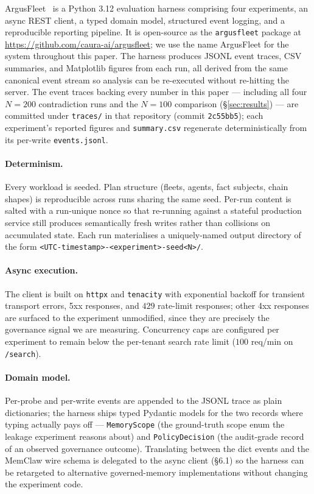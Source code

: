 \documentclass[10pt,twocolumn,letterpaper]{article}
\begin{document}
ArgusFleet~\citep{argusfleet} is a Python 3.12 evaluation harness comprising four experiments, an async REST client, a typed domain model, structured event logging, and a reproducible reporting pipeline. It is open-source as the \texttt{argusfleet} package at \url{https://github.com/caura-ai/argusfleet}; we use the name ArgusFleet for the system throughout this paper. The harness produces JSONL event traces, CSV summaries, and Matplotlib figures from each run, all derived from the same canonical event stream so analysis can be re-executed without re-hitting the server. The event traces backing every number in this paper --- including all four \(N{=}200\) contradiction runs and the \(N{=}100\) comparison (\S\ref{sec:results}) --- are committed under \texttt{traces/} in that repository (commit \texttt{2c55bb5}); each experiment's reported figures and \texttt{summary.csv} regenerate deterministically from its per-write \texttt{events.jsonl}.

\paragraph{Determinism.}
Every workload is seeded. Plan structure (fleets, agents, fact subjects, chain shapes) is reproducible across runs sharing the same seed. Per-run content is salted with a run-unique nonce so that re-running against a stateful production service still produces semantically fresh writes rather than collisions on accumulated state. Each run materialises a uniquely-named output directory of the form \texttt{<UTC-timestamp>-<experiment>-seed<N>/}.

\paragraph{Async execution.}
The client is built on \texttt{httpx} and \texttt{tenacity} with exponential backoff for transient transport errors, 5xx responses, and \(429\) rate-limit responses; other 4xx responses are surfaced to the experiment unmodified, since they are precisely the governance signal we are measuring. Concurrency caps are configured per experiment to remain below the per-tenant search rate limit (\(100\) req/min on \texttt{/search}).

\paragraph{Domain model.}
Per-probe and per-write events are appended to the JSONL trace as
plain dictionaries; the harness ships typed Pydantic models for the two
records where typing actually pays off --- \texttt{MemoryScope} (the
ground-truth scope enum the leakage experiment reasons about) and
\texttt{PolicyDecision} (the audit-grade record of an observed
governance outcome). Translating between the dict events and the
MemClaw wire schema is delegated to the async client (\S6.1) so the
harness can be retargeted to alternative governed-memory implementations
without changing the experiment code.
\end{document}
